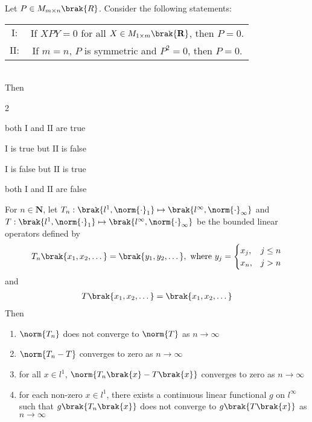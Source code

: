 		\item 
		Let $P \in M_{m \times n}\brak{R}$. Consider the following statements: \\
		\begin{tabular}{c  c}
			$\mathrm{I:}$ & If $XPY = 0$ for all $X \in M_{1 \times m}\brak{\mathbf{R}}$, then $P = 0$.\\
			$\mathrm{II:}$ & If $m = n$, $P$ is symmetric and $P^2 = 0$, then $P = 0$. \\
		\end{tabular}\\
		Then 
		
		\hfill{}
		
		\begin{enumerate}
		\end{enumerate}

		\item 
			For $n \in \mathbf{N}$, let $T_n: \brak{l^1,\norm{\cdot}_1} \mapsto \brak{l^{\infty}, \norm{\cdot}_{\infty}}$ and $T: \brak{l^1,\norm{\cdot}_1} \mapsto \brak{l^{\infty}, \norm{\cdot}_{\infty}}$ be the bounded linear operators defined by 
		\begin{align*}
			T_n\brak{x_1,x_2,\dots} = \brak{y_1, y_2, \dots}, \text{ where } y_j = 
			\begin{cases}
				x_j ,& j \leq n\\
				x_n ,& j > n
			\end{cases}\\
		\end{align*}
		and 
		\begin{align*}
			T\brak{x_1, x_2, \dots} = \brak{x_1, x_2, \dots}
		\end{align*}
		Then 
		
		\hfill{\brak{\text{MA 2020}}}
		
		\begin{enumerate}
			\item $\norm{T_n}$ does not converge to $\norm{T}$ as $n\to \infty$
			\item $\norm{T_n - T}$ converges to zero as $n\to \infty$
			\item for all $x \in l^1$, $\norm{T_n\brak{x} - T\brak{x}}$ converges to zero as $n\to \infty$
			\item for each non-zero $x \in l^1$, there exists a continuous linear functional $g$ on $l^{\infty}$ such that $g\brak{T_n\brak{x}}$ does not converge to $g\brak{T\brak{x}}$ as $n\to \infty$
		\end{enumerate}


